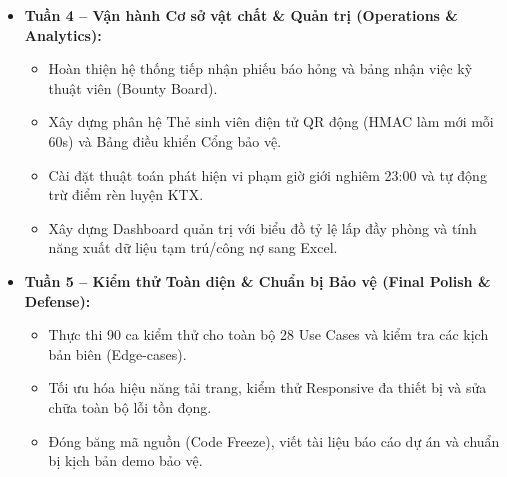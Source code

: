 \begin{itemize}
    \item \textbf{Tuần 4 -- Vận hành Cơ sở vật chất \& Quản trị (Operations \& Analytics):}
    \begin{itemize}
        \item Hoàn thiện hệ thống tiếp nhận phiếu báo hỏng và bảng nhận việc kỹ thuật viên (Bounty Board).
        \item Xây dựng phân hệ Thẻ sinh viên điện tử QR động (HMAC làm mới mỗi 60s) và Bảng điều khiển Cổng bảo vệ.
        \item Cài đặt thuật toán phát hiện vi phạm giờ giới nghiêm 23:00 và tự động trừ điểm rèn luyện KTX.
        \item Xây dựng Dashboard quản trị với biểu đồ tỷ lệ lấp đầy phòng và tính năng xuất dữ liệu tạm trú/công nợ sang Excel.
    \end{itemize}

    \item \textbf{Tuần 5 -- Kiểm thử Toàn diện \& Chuẩn bị Bảo vệ (Final Polish \& Defense):}
    \begin{itemize}
        \item Thực thi 90 ca kiểm thử cho toàn bộ 28 Use Cases và kiểm tra các kịch bản biên (Edge-cases).
        \item Tối ưu hóa hiệu năng tải trang, kiểm thử Responsive đa thiết bị và sửa chữa toàn bộ lỗi tồn đọng.
        \item Đóng băng mã nguồn (Code Freeze), viết tài liệu báo cáo dự án và chuẩn bị kịch bản demo bảo vệ.
    \end{itemize}
\end{itemize}

